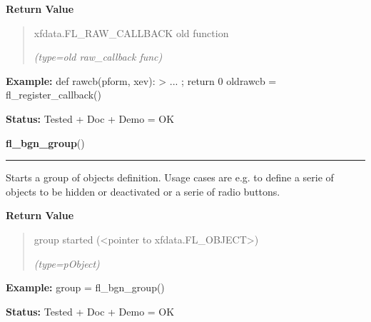\begin{boxedminipage}{\funcwidth}
      \textbf{Return Value}
    \vspace{-1ex}

      \begin{quote}
      xfdata.FL\_RAW\_CALLBACK old function

      {\it (type=old raw\_callback func)}

      \end{quote}

\textbf{Example:} def rawcb(pform, xev): {\textgreater} ... ; return 0 oldrawcb = 
fl\_register\_callback()



\textbf{Status:} Tested + Doc + Demo = OK



    \end{boxedminipage}

    \label{xformslib:library:fl_bgn_group}

    \vspace{0.5ex}

\hspace{.8\funcindent}\begin{boxedminipage}{\funcwidth}

    \raggedright \textbf{fl\_bgn\_group}()

    \vspace{-1.5ex}

    \rule{\textwidth}{0.5\fboxrule}
\setlength{\parskip}{2ex}
    Starts a group of objects definition. Usage cases are e.g. to define a 
    serie of objects to be hidden or deactivated or a serie of radio 
    buttons.

\setlength{\parskip}{1ex}
      \textbf{Return Value}
    \vspace{-1ex}

      \begin{quote}
      group started ({\textless}pointer to xfdata.FL\_OBJECT{\textgreater})

      {\it (type=pObject)}

      \end{quote}

\textbf{Example:} group = fl\_bgn\_group()



\textbf{Status:} Tested + Doc + Demo = OK



    \end{boxedminipage}

